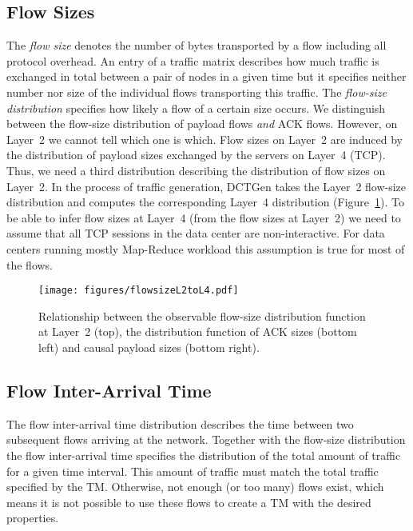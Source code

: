 \documentclass[journal,10pt]{IEEEtran}
\newcommand{\genname}{DCTGen}
\newcommand{\lt}{Layer~2}
\begin{document}
		


	\subsection{Flow Sizes}
\label{sec:flow-sizes}
		The \emph{flow size} denotes the number of bytes transported by a flow including all protocol overhead.
An entry of a traffic matrix describes how much traffic is exchanged in total between a pair of nodes in a given time but it specifies neither
		number nor size of the individual flows transporting this traffic.
		The \emph{flow-size distribution} specifies how likely a flow of a certain size occurs.
		We distinguish between the flow-size distribution of payload flows \emph{and} ACK flows. 
		However, on Layer~2 we cannot tell which one is which.
		Flow sizes on Layer~2 are induced by the distribution of payload sizes exchanged by the servers on Layer~4 (TCP).
		Thus, we need a third distribution describing the distribution of flow sizes on \lt{}.
		In the process of traffic generation, \genname{} takes the Layer~2 flow-size distribution and computes the corresponding Layer~4 distribution 
		(Figure~\ref{fig:flowsizeL2toL4}).
To be able to infer flow sizes at Layer~4 (from the flow sizes at \lt{}) we need to assume that all TCP sessions in the data center are non-interactive.
		For data centers running mostly Map-Reduce workload this assumption is true for most of the flows.
		
\begin{figure}
	\centering
	\texttt{[image: figures/flowsizeL2toL4.pdf]}
	\caption{Relationship between the observable flow-size distribution function at Layer~2 (top), the distribution function of ACK sizes (bottom left) and
	causal payload sizes (bottom right).}
	\label{fig:flowsizeL2toL4}
\end{figure}
		
		


	\subsection{Flow Inter-Arrival Time}
\label{sec:flow-inter-arrival}
	The flow inter-arrival time distribution describes the time between two subsequent flows arriving at the network.
	Together with the flow-size distribution the flow inter-arrival time specifies the distribution of the total amount of traffic
	for a given time interval.
	This amount of traffic must match the total traffic specified by the TM.
	Otherwise, not enough (or too many) flows exist, which means it is not possible to use these flows to create a TM with the desired properties.
	
\end{document}
